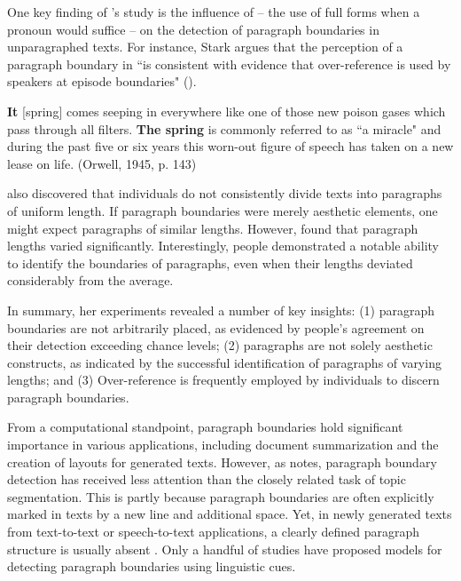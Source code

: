 One key finding of \citet{Stark1988}'s study is the influence of  -- the use of full forms when a pronoun would suffice -- on the detection of paragraph boundaries in unparagraphed texts. For instance, Stark argues that the perception of a paragraph boundary in  ``is consistent with evidence that over-reference is used by speakers at episode boundaries" (\citeyear[291]{Stark1988}).


\begin{exe}
	\ex
	\begin{xlist}
		\ex \label{ex:springpro} \textbf{It} [spring] comes seeping in everywhere like one of those new poison gases which pass through all filters. 
		\ex \textbf{The spring} is commonly referred to as ``a miracle" and during the past five or six years this worn-out figure of speech has taken on a new lease on life. (Orwell, 1945, p. 143) \label{ex:springfull} 
	\end{xlist}
	
\end{exe}



\citet{Stark1988} also discovered that individuals do not consistently divide texts into paragraphs of uniform length. If paragraph boundaries were merely aesthetic elements, one might expect paragraphs of similar lengths. However, \citet{Stark1988} found that paragraph lengths varied significantly. Interestingly, people demonstrated a notable ability to identify the boundaries of paragraphs, even when their lengths deviated considerably from the average.

In summary, her experiments revealed a number of key insights: (1) paragraph boundaries are not arbitrarily placed, as evidenced by people's agreement on their detection exceeding chance levels; (2) paragraphs are not solely aesthetic constructs, as indicated by the successful identification of paragraphs of varying lengths; and (3) Over-reference is frequently employed by individuals to discern paragraph boundaries.

From a computational standpoint, paragraph boundaries hold significant importance in various applications, including document summarization and the creation of layouts for generated texts. However, as \citet{Sporleder2006} notes, paragraph boundary detection has received less attention than the closely related task of topic segmentation. This is partly because paragraph boundaries are often explicitly marked in texts by a new line and additional space. Yet, in newly generated texts from text-to-text or speech-to-text applications, a clearly defined paragraph structure is usually absent \citep{Sporleder2006}. Only a handful of studies \citep{Bolshakov2001, sporleder-lapata-2004-automatic, Sporleder2006, filippova-strube-2006-using} have proposed models for detecting paragraph boundaries using linguistic cues.

